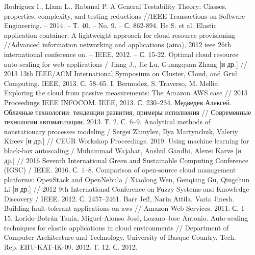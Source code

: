 \begin{thebibliography}{40}
Rodriguez I., Llana L., Rabanal P. A General Testability Theory: Classes, properties, complexity, and testing reductions //IEEE Transactions on Software Engineering. – 2014. – Т. 40. – No. 9. – С. 862-894.
He S. et al. Elastic application container: A lightweight approach for cloud resource provisioning //Advanced information networking and applications (aina), 2012 ieee 26th international conference on. – IEEE, 2012. – С. 15-22.
Optimal cloud resource auto-scaling for web applications / Jiang J., Jie Lu, Guangquan Zhang [и др.] // 2013 13th IEEE/ACM International Symposium on Cluster, Cloud, and Grid Computing. IEEE, 2013. С. 58–65.
I. Bermudez, S. Traverso, M. Mellia. Exploring the cloud from passive measurements: The Amazon AWS case // 2013 Proceedings IEEE INFOCOM. IEEE, 2013. С. 230–234.
Медведев Алексей. Облачные технологии: тенденции развития, примеры исполнения // Современные технологии автоматизации. 2013. Т. 2. С. 6–9.
Analytical methods of nonstationary processes modeling / Sergei Zhmylev, Ilya Martynchuk, Valeriy Kireev [и др.] // CEUR Workshop Proceedings. 2019.
Using machine learning for black-box autoscaling / Muhammad Wajahat, Anshul Gandhi, Alexei Karve [и др.] // 2016 Seventh International Green and Sustainable Computing Conference (IGSC) / IEEE. 2016. С. 1–8.
Comparison of open-source cloud management platforms: OpenStack and OpenNebula / Xiaolong Wen, Genqiang Gu, Qingchun Li [и др.] // 2012 9th International Conference on Fuzzy Systems and Knowledge Discovery / IEEE. 2012. С. 2457–2461.
Barr Jeff, Narin Attila, Varia Jinesh. Building fault-tolerant applications on aws // Amazon Web Services. 2011. С. 1–15.
Lorido-Botrán Tania, Miguel-Alonso José, Lozano Jose Antonio. Auto-scaling techniques for elastic applications in cloud environments // Department of Computer Architecture and Technology, University of Basque Country, Tech. Rep. EHU-KAT-IK-09. 2012. Т. 12. С. 2012.

\end{thebibliography}
